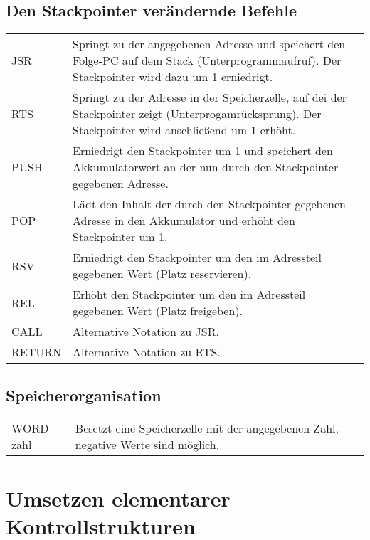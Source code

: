 \documentclass{lehramt-informatik-haupt}
\begin{document}
%

\subsection{Den Stackpointer verändernde Befehle}

\begin{tabularx}{\linewidth}{lX}
JSR & Springt zu der angegebenen Adresse und speichert den Folge-PC auf dem Stack (Unterprogrammaufruf). Der Stackpointer wird dazu um 1 erniedrigt. \\
RTS & Springt zu der Adresse in der Speicherzelle, auf dei der Stackpointer zeigt (Unterprogamrücksprung). Der Stackpointer wird anschließend um 1 erhöht. \\
PUSH & Erniedrigt den Stackpointer um 1 und speichert den Akkumulatorwert an der nun durch den Stackpointer gegebenen Adresse. \\
POP & Lädt den Inhalt der durch den Stackpointer gegebenen Adresse in den Akkumulator und erhöht den Stackpointer um 1. \\
RSV & Erniedrigt den Stackpointer um den im Adressteil gegebenen Wert (Platz reservieren). \\
REL & Erhöht den Stackpointer um den im Adressteil gegebenen Wert (Platz freigeben). \\
CALL & Alternative Notation zu JSR. \\
RETURN & Alternative Notation zu RTS. \\
\end{tabularx}

\subsection{Speicherorganisation}

\begin{tabularx}{\linewidth}{lX}
WORD zahl & Besetzt eine Speicherzelle mit der angegebenen Zahl, negative Werte sind möglich. \\
\end{tabularx}

%

\section{Umsetzen elementarer Kontrollstrukturen}

%
\end{document}
